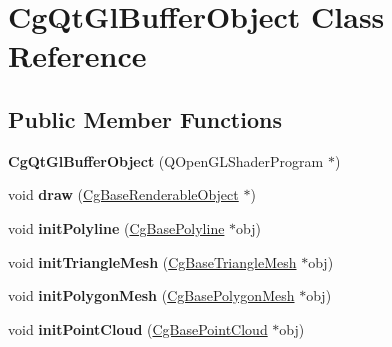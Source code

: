 \hypertarget{class_cg_qt_gl_buffer_object}{}\section{Cg\+Qt\+Gl\+Buffer\+Object Class Reference}
\label{class_cg_qt_gl_buffer_object}
\subsection*{Public Member Functions}
\begin{DoxyCompactItemize}
\item 
\mbox{\label{class_cg_qt_gl_buffer_object_ac84599f85ae621642ddda9406dec3f6e}} 
{\bfseries Cg\+Qt\+Gl\+Buffer\+Object} (Q\+Open\+G\+L\+Shader\+Program $\ast$)
\item 
\mbox{\label{class_cg_qt_gl_buffer_object_a05cd117a1d28622f65594c85ab729249}} 
void {\bfseries draw} (\hyperlink{class_cg_base_renderable_object}{Cg\+Base\+Renderable\+Object} $\ast$)
\item 
\mbox{\label{class_cg_qt_gl_buffer_object_ac8f6b9ddd7f04178e8f90eaa7d5cb32d}} 
void {\bfseries init\+Polyline} (\hyperlink{class_cg_base_polyline}{Cg\+Base\+Polyline} $\ast$obj)
\item 
\mbox{\label{class_cg_qt_gl_buffer_object_aa7b02747e225723e08b7b9d87eb871a3}} 
void {\bfseries init\+Triangle\+Mesh} (\hyperlink{class_cg_base_triangle_mesh}{Cg\+Base\+Triangle\+Mesh} $\ast$obj)
\item 
\mbox{\label{class_cg_qt_gl_buffer_object_ac8ab7fd733fe47e43ddcdcebdd8daf4e}} 
void {\bfseries init\+Polygon\+Mesh} (\hyperlink{class_cg_base_polygon_mesh}{Cg\+Base\+Polygon\+Mesh} $\ast$obj)
\item 
\mbox{\label{class_cg_qt_gl_buffer_object_a3d0009cc610147e49c37403573c9510f}} 
void {\bfseries init\+Point\+Cloud} (\hyperlink{class_cg_base_point_cloud}{Cg\+Base\+Point\+Cloud} $\ast$obj)
\end{DoxyCompactItemize}
